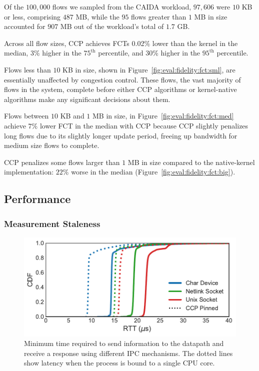 Of the $100,000$ flows we sampled from the CAIDA workload, $97,606$ were $10$ KB or less, comprising $487$ MB, while the $95$ flows greater than $1$ MB in size accounted for $907$ MB out of the workload's total of $1.7$ GB.

Across all flow sizes, CCP achieves FCTs 0.02\% lower than the kernel in the median, 3\% higher in the $75^{\text{th}}$ percentile, and $30$\% higher in the $95^{\text{th}}$ percentile.

 Flows less than $10$ KB in size, shown in Figure~\ref{fig:eval:fidelity:fct:sml}, are essentially unaffected by congestion control. These flows, the vast majority of flows in the system, complete before either CCP algorithms or kernel-native algorithms make any significant decisions about them.

 Flows between $10$ KB and $1$ MB in size, in Figure~\ref{fig:eval:fidelity:fct:med}  achieve $7\%$ lower FCT in the median with CCP because CCP slightly penalizes long flows due to its slightly longer update period, freeing up bandwidth for medium size flows to complete.

 CCP penalizes some flows larger than $1$ MB in size compared to the native-kernel implementation: $22$\% worse in the median (Figure~\ref{fig:eval:fidelity:fct:big}).

\subsection{Performance}
\label{sec:eval:whyfold}

\subsubsection{Measurement Staleness}
\label{sec:eval:whyfold:stale}
\begin{figure}[t]
\centering
    \includegraphics[width=\columnwidth]{img/ipc-latency}
    \caption{Minimum time required to send information to the datapath and receive a response using different IPC mechanisms. The dotted lines show latency when the process is bound to a single CPU core.}\label{fig:eval:ipc-latency}
\end{figure}

